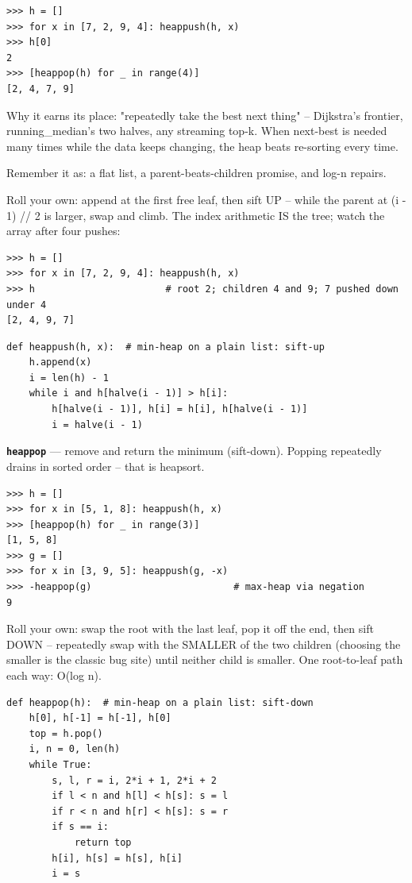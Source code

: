 \documentclass[10pt,letterpaper]{article}
\begin{document}
\begin{lstlisting}[style=ex]
>>> h = []
>>> for x in [7, 2, 9, 4]: heappush(h, x)
>>> h[0]
2
>>> [heappop(h) for _ in range(4)]
[2, 4, 7, 9]
\end{lstlisting}

Why it earns its place: "repeatedly take the best next thing" -- Dijkstra's frontier, running\_median's two halves, any streaming top-k. When next-best is needed many times while the data keeps changing, the heap beats re-sorting every time.


Remember it as: a flat list, a parent-beats-children promise, and log-n repairs.


Roll your own: append at the first free leaf, then sift UP -- while the parent at (i - 1) // 2 is larger, swap and climb. The index arithmetic IS the tree; watch the array after four pushes:

\begin{lstlisting}[style=ex]
>>> h = []
>>> for x in [7, 2, 9, 4]: heappush(h, x)
>>> h                       # root 2; children 4 and 9; 7 pushed down under 4
[2, 4, 9, 7]
\end{lstlisting}
\begin{lstlisting}[style=ex]
def heappush(h, x):  # min-heap on a plain list: sift-up
    h.append(x)
    i = len(h) - 1
    while i and h[halve(i - 1)] > h[i]:
        h[halve(i - 1)], h[i] = h[i], h[halve(i - 1)]
        i = halve(i - 1)
\end{lstlisting}
\textbf{\texttt{heappop}} --- remove and return the minimum (sift-down). Popping repeatedly drains in sorted order -- that is heapsort.
\begin{lstlisting}[style=ex]
>>> h = []
>>> for x in [5, 1, 8]: heappush(h, x)
>>> [heappop(h) for _ in range(3)]
[1, 5, 8]
>>> g = []
>>> for x in [3, 9, 5]: heappush(g, -x)
>>> -heappop(g)                         # max-heap via negation
9
\end{lstlisting}

Roll your own: swap the root with the last leaf, pop it off the end, then sift DOWN -- repeatedly swap with the SMALLER of the two children (choosing the smaller is the classic bug site) until neither child is smaller. One root-to-leaf path each way: O(log n).

\begin{lstlisting}[style=ex]
def heappop(h):  # min-heap on a plain list: sift-down
    h[0], h[-1] = h[-1], h[0]
    top = h.pop()
    i, n = 0, len(h)
    while True:
        s, l, r = i, 2*i + 1, 2*i + 2
        if l < n and h[l] < h[s]: s = l
        if r < n and h[r] < h[s]: s = r
        if s == i:
            return top
        h[i], h[s] = h[s], h[i]
        i = s
\end{lstlisting}
\end{document}
